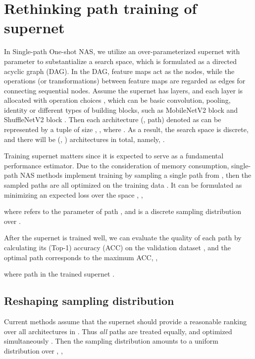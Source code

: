 \documentclass[10pt,twocolumn,letterpaper]{article}
\begin{document}
\section{Rethinking path training of supernet} 
In Single-path One-shot NAS, we utilize an over-parameterized supernet  with parameter  to substantialize a search space, which is formulated as a directed acyclic graph (DAG). In the DAG, feature maps act as the nodes, while the operations (or transformations) between feature maps are regarded as edges for connecting sequential nodes. Assume the supernet  has  layers, and each layer  is allocated with  operation choices , which can be basic convolution, pooling, identity or different types of building blocks, such as MobileNetV2 block \cite{mobilenetv2} and ShuffleNetV2 block \cite{shufflenetv2}. Then each architecture (\ie, path) denoted as  can be represented by a tuple of size , \ie,  where . As a result, the search space  is discrete, and there will be  (\eg, ) architectures in total, namely, . 

Training supernet matters since it is expected to serve as a fundamental performance estimator. Due to the consideration of memory consumption, single-path NAS methods implement training by sampling a single path  from , then the sampled paths are all optimized on the training data . It can be formulated as minimizing an expected loss over the space , \ie, 
\vspace{-1mm}

where  refers to the parameter of path , and  is a discrete sampling distribution over . 

After the supernet  is trained well, we can evaluate the quality of each path by calculating its (Top-1) accuracy (ACC) on the validation dataset , and the optimal path  corresponds to the maximum ACC, \ie,
\vspace{-1mm}

where  \wrt path  in the trained supernet . 

\subsection{Reshaping sampling distribution }

Current methods assume that the supernet should provide a reasonable ranking over all architectures in . Thus \textit{all} paths  are treated equally, and optimized simultaneously \cite{random,face++,fairnas,scarletnas}. 
Then the sampling distribution  amounts to a uniform distribution  over , \ie,
\vspace{-2mm}
\end{document}
